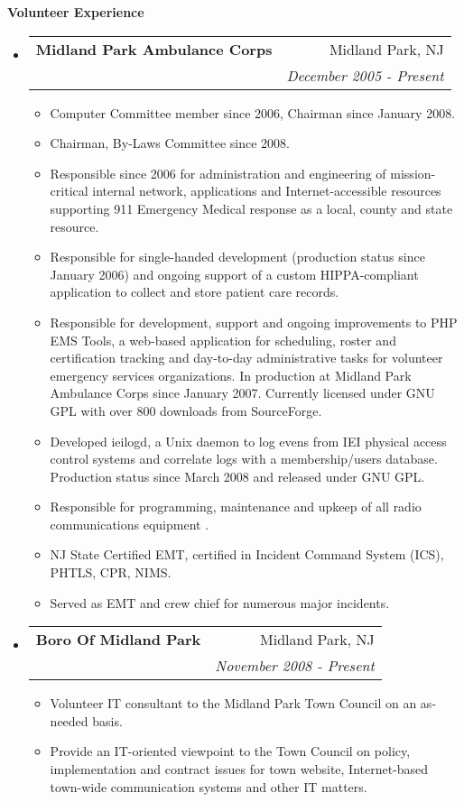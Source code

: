 \documentclass[letterpaper,11pt]{article}
\makeatletter
\newcommand{\resitem}[1]{\item #1 \vspace{-2pt}}
\newcommand{\resheading}[1]{{\large \colorbox{mygrey}{\begin{minipage}{\textwidth}{\textbf{#1 \vphantom{p\^{E}}}}\end{minipage}}}}
\newcommand{\ressubheading}[4]{
\begin{tabular*}{7.0in}{l@{\extracolsep{\fill}}r}
		\textbf{#1} & #2 \\
		\textit{#3} & \textit{#4} \\
\end{tabular*}\vspace{-6pt}}
\makeatother
\begin{document}
\resheading{Volunteer Experience}
\begin{itemize}
\item
        \ressubheading{Midland Park Ambulance Corps}{Midland Park, NJ}{ }{December 2005 - Present}
        \begin{itemize}
                \resitem{Computer Committee member since 2006, Chairman since
                  January 2008.}
                \resitem{Chairman, By-Laws Committee since 2008.}
                \resitem{Responsible since 2006 for administration and engineering of
                  mission-critical internal network, applications and
                  Internet-accessible resources supporting 911 Emergency
                  Medical response as a local, county and state resource.}
                \resitem{Responsible for single-handed development (production
                  status since January 2006) and ongoing support of a custom
                  HIPPA-compliant application to collect and store patient
                  care records.}
                \resitem{Responsible for development, support and ongoing
                  improvements to PHP EMS Tools, a web-based application for
                  scheduling, roster and certification tracking and day-to-day
                administrative tasks for volunteer emergency services
                organizations. In production at Midland Park Ambulance Corps
                since January 2007. Currently licensed under GNU GPL with over
                800 downloads from SourceForge.}
                \resitem{Developed ieilogd, a Unix daemon to log evens from
                  IEI physical access control systems and correlate logs with
                  a membership/users database. Production status since March
                  2008 and released under GNU GPL.}
                \resitem{Responsible for programming, maintenance and upkeep
                  of all radio communications equipment}.
                \resitem{NJ State Certified EMT, certified in Incident Command
                System (ICS), PHTLS, CPR, NIMS.}
                \resitem{Served as EMT and crew chief for numerous major
                  incidents.}
        \end{itemize}

\item
        \ressubheading{Boro Of Midland Park}{Midland Park, NJ}{}{November 2008 - Present}
        \begin{itemize}
                \resitem{Volunteer IT consultant to the Midland Park Town
                  Council on an as-needed basis.}
                \resitem{Provide an IT-oriented viewpoint to the Town Council on
                  policy, implementation and contract issues for town website,
                  Internet-based town-wide communication systems and other IT matters.}
        \end{itemize}
\end{itemize}
\end{document}
